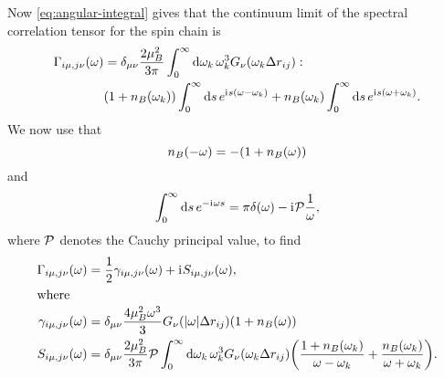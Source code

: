\documentclass[../thesis.tex]{subfiles}
\begin{document}
Now \cref{eq:angular-integral} gives that the continuum limit of the spectral
correlation tensor for the spin chain is
\begin{align}
  \begin{split}
  \Gamma_{i\mu,j\nu}(\omega)
  &= \delta_{\mu\nu} \frac{2\mu_B^2}{3\pi}
  \int_0^\infty \dd{\omega_k} \omega_k^3
  G_{\nu}\qty(\omega_k \Delta r_{ij})
  :
  \\
  &\qty(1 + n_B(\omega_k)) \int_0^\infty \dd{s} e^{\mathrm{i}\mkern1mu s(\omega - \omega_k)}
  + n_B(\omega_k) \int_0^\infty \dd{s} e^{\mathrm{i}\mkern1mu s(\omega + \omega_k)}.
  \end{split}
\end{align}
We now use that
\begin{equation}
  n_B(-\omega)
  = -\qty(1 + n_B(\omega))
\end{equation}
and 
\begin{equation}
  \int_0^\infty \dd{s} e^{-\im\omega s}
  = \pi\delta(\omega) - \im\pv\frac{1}{\omega},
\end{equation}
where $\pv$ denotes the Cauchy principal value, to find
\begin{align}
  \Gamma_{i\mu,j\nu}(\omega)
  &= \frac{1}{2}\gamma_{i\mu,j\nu}(\omega) + \im S_{i\mu,j\nu}(\omega),
  \\
  \shortintertext{where}
  \gamma_{i\mu,j\nu}(\omega)
  &= \delta_{\mu\nu} \frac{4\mu_B^2 \omega^3}{3}
  G_{\nu}\qty(\abs{\omega} \Delta r_{ij})
  (1 + n_B(\omega))
  \label{eq:gamma-full}
  \\
  S_{i\mu,j\nu}(\omega)
  &= \delta_{\mu\nu} \frac{2\mu_B^2}{3\pi}
  \pv\int_0^\infty \dd{\omega_k} \omega_k^3
  G_{\nu}\qty(\omega_k \Delta r_{ij})
  \qty(\frac{1 + n_B(\omega_k)}{\omega - \omega_k}
  + \frac{n_B(\omega_k)}{\omega + \omega_k}).
  \label{eq:S-full}
\end{align}
\end{document}

